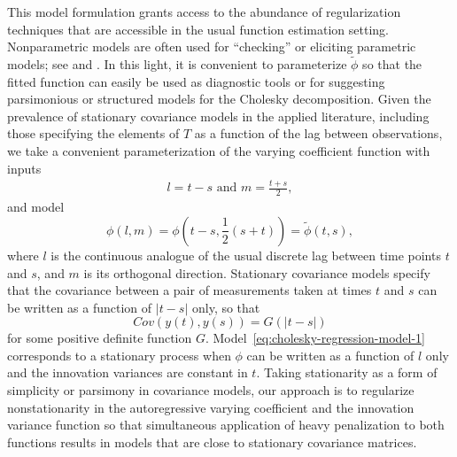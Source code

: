 This model formulation grants access to the abundance of regularization techniques that are accessible in the usual function estimation setting. Nonparametric models are often used for ``checking'' or eliciting parametric models; see \cite{cox1988testing} and \cite{liu2004hypothesis}. In this light, it is convenient to parameterize $\tilde{\phi}$ so that the fitted function can easily be used as diagnostic tools or for suggesting parsimonious or structured models for the Cholesky decomposition. Given the prevalence of stationary covariance models in the applied literature, including those specifying the elements of $T$ as a function of the lag between observations, we take a convenient parameterization of the varying coefficient function with inputs
\begin{align}\label{eq:l-m-transformation}
l = t - s \mbox{ and } m = \frac{t + s}{2}, 
\end{align}
\noindent
and model 
\begin{equation} \label{eq:phi-to-tilde-phi} 
\phi\left(l,m\right) = {\phi}\left(t-s, \frac{1}{2}\left(s+t\right)\right) = \tilde{\phi}\left(t,s\right),
\end{equation}
\noindent
where $l$ is the continuous analogue of the usual discrete lag between time points $t$ and $s$, and $m$ is its orthogonal direction. Stationary covariance models specify that the covariance between a pair of measurements taken at times $t$ and $s$ can be written as a function of $\vert t - s\vert $ only, so that
\begin{equation*}
Cov\left(y\left( t \right),y\left( s \right)\right) = G\left( \vert t - s\vert  \right)
\end{equation*}
\noindent
for some positive definite function $G$. Model~\eqref{eq:cholesky-regression-model-1} corresponds to a stationary process when $\phi$ can be written as a function of $l$ only and the innovation variances are constant in $t$. Taking stationarity as a form of simplicity or parsimony in covariance models, our approach is to regularize nonstationarity in the autoregressive varying coefficient and the innovation variance function so that simultaneous application of heavy penalization to both functions results in models that are close to stationary covariance matrices.%


